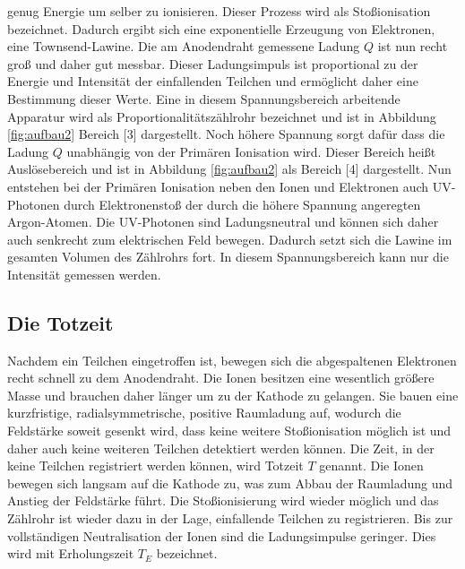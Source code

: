     genug Energie um selber zu ionisieren. Dieser Prozess wird als Stoßionisation bezeichnet. Dadurch
    ergibt sich eine exponentielle Erzeugung von Elektronen, eine Townsend-Lawine. Die am Anodendraht
    gemessene Ladung $Q$ ist nun recht groß und daher gut messbar. Dieser Ladungsimpuls ist
    proportional zu der Energie und Intensität der einfallenden Teilchen und ermöglicht daher eine
    Bestimmung dieser Werte. Eine in diesem Spannungsbereich arbeitende Apparatur wird als
    Proportionalitätszählrohr bezeichnet und ist in Abbildung \ref{fig:aufbau2} Bereich [3]
    dargestellt.
    Noch höhere Spannung sorgt dafür dass die Ladung $Q$ unabhängig von der Primären Ionisation wird.
    Dieser Bereich heißt Auslösebereich und ist in Abbildung \ref{fig:aufbau2} als Bereich [4]
    dargestellt. Nun entstehen bei der Primären Ionisation neben den Ionen und Elektronen auch
    UV-Photonen durch Elektronenstoß der durch die höhere Spannung angeregten Argon-Atomen. Die
    UV-Photonen sind Ladungsneutral und können sich daher auch senkrecht zum elektrischen Feld bewegen.
    Dadurch setzt sich die Lawine im gesamten Volumen des Zählrohrs fort. In diesem Spannungsbereich
    kann nur die Intensität gemessen werden.
  \subsection{Die Totzeit}
    Nachdem ein Teilchen eingetroffen ist, bewegen sich die abgespaltenen Elektronen recht schnell zu
    dem Anodendraht. Die Ionen besitzen eine wesentlich größere Masse und brauchen daher länger um zu
    der Kathode zu gelangen. Sie bauen eine kurzfristige, radialsymmetrische, positive Raumladung auf,
    wodurch die Feldstärke soweit gesenkt wird, dass keine weitere Stoßionisation möglich ist und
    daher auch keine weiteren Teilchen detektiert werden können. Die Zeit, in der keine Teilchen
    registriert werden können, wird Totzeit $T$ genannt. Die Ionen bewegen sich langsam auf die
    Kathode zu, was zum Abbau der Raumladung und Anstieg der Feldstärke führt. Die Stoßionisierung
    wird wieder möglich und das Zählrohr ist wieder dazu in der Lage, einfallende Teilchen zu
    registrieren. Bis zur vollständigen Neutralisation der Ionen sind die Ladungsimpulse geringer.
    Dies wird mit Erholungszeit $T_{E}$ bezeichnet.
